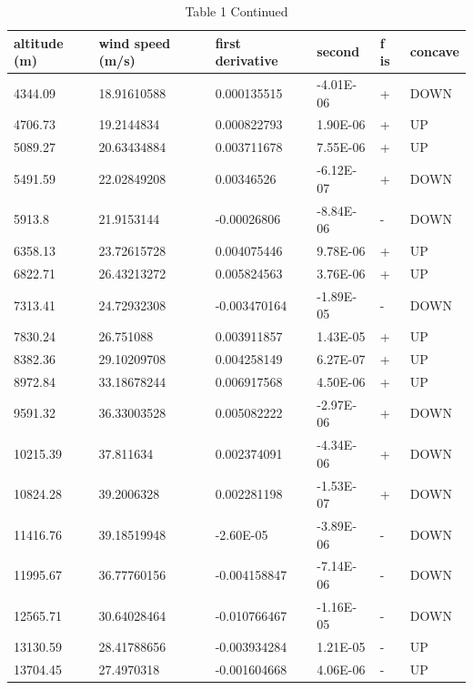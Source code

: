 \documentclass{article}
\begin{document}
\begin{table}[]
\centering
\caption{Table 1 Continued}
\label{joshtable2}
\begin{tabular}{@{}llllll@{}}
\toprule
altitude (m) & wind speed (m/s) & first derivative & second    & f is & concave \\ \midrule
4344.09      & 18.91610588      & 0.000135515      & -4.01E-06 & +    & DOWN    \\
4706.73      & 19.2144834       & 0.000822793      & 1.90E-06  & +    & UP      \\
5089.27      & 20.63434884      & 0.003711678      & 7.55E-06  & +    & UP      \\
5491.59      & 22.02849208      & 0.00346526       & -6.12E-07 & +    & DOWN    \\
5913.8       & 21.9153144       & -0.00026806      & -8.84E-06 & -    & DOWN    \\
6358.13      & 23.72615728      & 0.004075446      & 9.78E-06  & +    & UP      \\
6822.71      & 26.43213272      & 0.005824563      & 3.76E-06  & +    & UP      \\
7313.41      & 24.72932308      & -0.003470164     & -1.89E-05 & -    & DOWN    \\
7830.24      & 26.751088        & 0.003911857      & 1.43E-05  & +    & UP      \\
8382.36      & 29.10209708      & 0.004258149      & 6.27E-07  & +    & UP      \\
8972.84      & 33.18678244      & 0.006917568      & 4.50E-06  & +    & UP      \\
9591.32      & 36.33003528      & 0.005082222      & -2.97E-06 & +    & DOWN    \\
10215.39     & 37.811634        & 0.002374091      & -4.34E-06 & +    & DOWN    \\
10824.28     & 39.2006328       & 0.002281198      & -1.53E-07 & +    & DOWN    \\
11416.76     & 39.18519948      & -2.60E-05        & -3.89E-06 & -    & DOWN    \\
11995.67     & 36.77760156      & -0.004158847     & -7.14E-06 & -    & DOWN    \\
12565.71     & 30.64028464      & -0.010766467     & -1.16E-05 & -    & DOWN    \\
13130.59     & 28.41788656      & -0.003934284     & 1.21E-05  & -    & UP      \\
13704.45     & 27.4970318       & -0.001604668     & 4.06E-06  & -    & UP      \\

\end{tabular}
\end{table}
\end{document}
